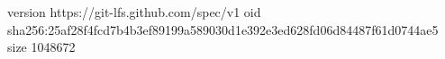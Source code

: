 version https://git-lfs.github.com/spec/v1
oid sha256:25af28f4fcd7b4b3ef89199a589030d1e392e3ed628fd06d84487f61d0744ae5
size 1048672
